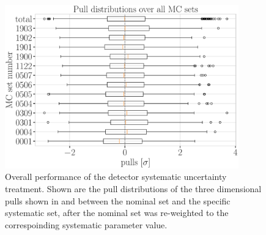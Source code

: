 \begin{figure}[h]
    \includegraphics[width=0.9\textwidth]{figures/results/utlrasurfaces/oscNext_leptoninjector_1.0_GeV_knn_probs_neighbors_500_weighted_nfiles_extended_holeice_corrected_grads_poly_2_weighted_reference_weight_0.0100_thesis_style-2.png}
    \caption[Detector systematic uncertainty treatment overall performance]{Overall performance of the detector systematic uncertainty treatment. Shown are the pull distributions of the three dimensional pulls shown in  and  between the nominal set and the specific systematic set, after the nominal set was re-weighted to the correspoinding systematic parameter value.}
\end{figure}

